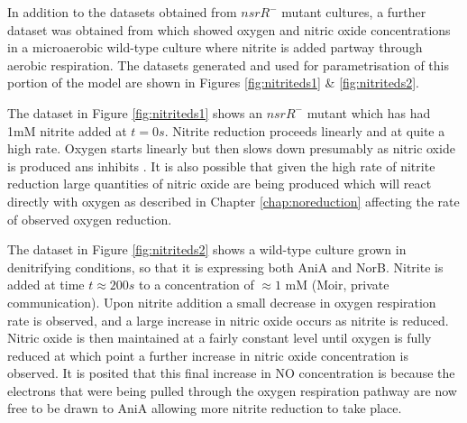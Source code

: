 In addition to the datasets obtained from $nsrR^-$ mutant cultures, a further dataset was obtained from \citet{Rock2005} which showed oxygen and nitric oxide concentrations in a microaerobic wild-type culture where nitrite is added partway through aerobic respiration. The datasets generated and used for parametrisation of this portion of the model are shown in Figures \ref{fig:nitriteds1} \& \ref{fig:nitriteds2}.

The dataset in Figure \ref{fig:nitriteds1} shows an $nsrR^-$ mutant which has had 1mM nitrite added at $t=0s$. Nitrite reduction proceeds linearly and at quite a high rate. Oxygen starts linearly but then slows down presumably as nitric oxide is produced ans inhibits \cbbthree{}. It is also possible that given the high rate of nitrite reduction large quantities of nitric oxide are being produced which will react directly with oxygen as described in Chapter \ref{chap:noreduction} affecting the rate of observed oxygen reduction.

The dataset in Figure \ref{fig:nitriteds2} shows a wild-type culture grown in denitrifying conditions, so that it is expressing both AniA and NorB. Nitrite is added at time $t\approx200s$ to a concentration of $\approx 1$ mM (Moir, private communication). Upon nitrite addition a small decrease in oxygen respiration rate is observed, and a large increase in nitric oxide occurs as nitrite is reduced. Nitric oxide is then maintained at a fairly constant level until oxygen is fully reduced at which point a further increase in nitric oxide concentration is observed. It is posited that this final increase in NO concentration is because the electrons that were being pulled through the oxygen respiration pathway are now free to be drawn to AniA allowing more nitrite reduction to take place.

